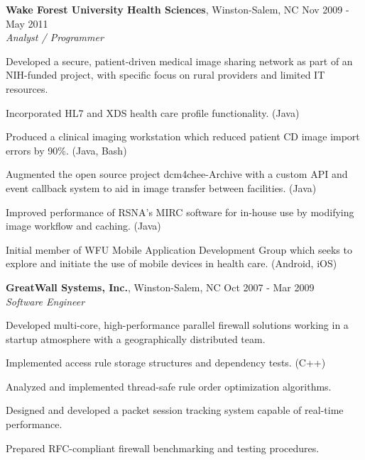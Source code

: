 \documentclass[margin,line]{resume}
\begin{document}
\begin{resume}
  \textbf{Wake Forest University Health Sciences}, Winston-Salem, NC \hfill Nov 2009 - May 2011\vspace{1mm}\\
  \textsl{Analyst / Programmer}\\
  \vspace{-3mm}
  \begin{list2}
  \item Developed a secure, patient-driven medical image sharing
    network as part of an NIH-funded project, with specific focus on
    rural providers and limited IT resources.
  \item Incorporated HL7 and XDS health care profile
    functionality. (Java)
  \item Produced a clinical imaging workstation which reduced patient
    CD image import errors by 90\%. (Java, Bash)
  \item Augmented the open source project dcm4chee-Archive with a
    custom API and event callback system to aid in image transfer
    between facilities. (Java)
  \item Improved performance of RSNA's MIRC software for in-house use
    by modifying image workflow and caching. (Java)
  \item Initial member of WFU Mobile Application Development Group
    which seeks to explore and initiate the use of mobile devices in
    health care. (Android, iOS)
  \end{list2}

  \textbf{GreatWall Systems, Inc.}, Winston-Salem, NC \hfill Oct 2007 - Mar 2009\vspace{1mm}\\
  \textsl{Software Engineer}\\
  \vspace{-3mm}
  \begin{list2}
  \item Developed multi-core, high-performance parallel firewall
    solutions working in a startup atmosphere with a geographically
    distributed team.
  \item Implemented access rule storage structures and dependency
    tests. (C++)
  \item Analyzed and implemented thread-safe rule order optimization
    algorithms.
  \item Designed and developed a packet session tracking system
    capable of real-time performance.
  \item Prepared RFC-compliant firewall benchmarking and testing
    procedures.
  \end{list2}


\end{resume}
\end{document}
